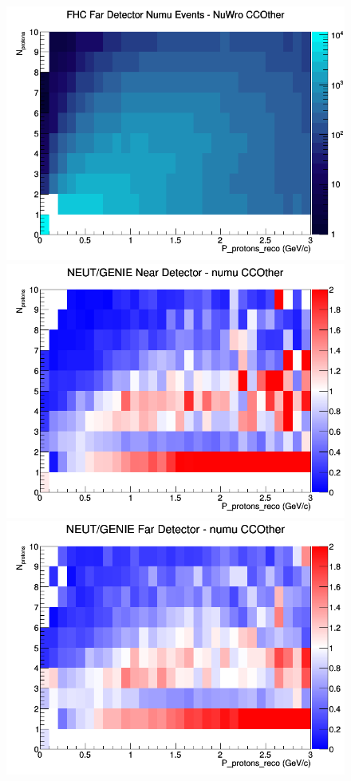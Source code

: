 \documentclass[12pt]{article}
\begin{document}
\begin{figure}[h]
\endminipage
{}
\includegraphics[width=\linewidth]{eff_N_P/GAr/protons/CCOther_FHC_FD_numu_N_P_NuWro.png}
\endminipage
\newline
{}
\includegraphics[width=\linewidth]{eff_N_P/GAr/protons/ratios/CCOther_NEUT_GENIE_numu_near_N_P.png}
\endminipage
{}
\includegraphics[width=\linewidth]{eff_N_P/GAr/protons/ratios/CCOther_NEUT_GENIE_numu_far_N_P.png}

\end{figure}
\end{document}

